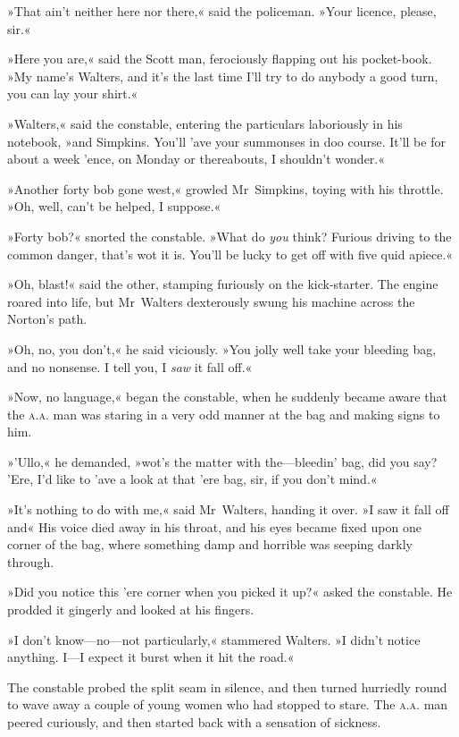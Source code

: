 »That ain't neither here nor there,« said the policeman. »Your licence, please, sir.«

»Here you are,« said the Scott man, ferociously flapping out his pocket-book. »My name's Walters, and it's the last time I'll try to do anybody a good turn, you can lay your shirt.«

»Walters,« said the constable, entering the particulars laboriously in his notebook, »and Simpkins. You'll 'ave your summonses in doo course. It'll be for about a week 'ence, on Monday or thereabouts, I shouldn't wonder.«

»Another forty bob gone west,« growled Mr~Simpkins, toying with his throttle. »Oh, well, can't be helped, I suppose.«

»Forty bob?« snorted the constable. »What do \textit{you} think? Furious driving to the common danger, that's wot it is. You'll be lucky to get off with five quid apiece.«

»Oh, blast!« said the other, stamping furiously on the kick-starter. The engine roared into life, but Mr~Walters dexterously swung his machine across the Norton's path.

»Oh, no, you don't,« he said viciously. »You jolly well take your bleeding bag, and no nonsense. I tell you, I \textit{saw} it fall off.«

»Now, no language,« began the constable, when he suddenly became aware that the \textsc{a.a.} man was staring in a very odd manner at the bag and making signs to him.

»'Ullo,« he demanded, »wot's the matter with the—bleedin' bag, did you say? 'Ere, I'd like to 'ave a look at that 'ere bag, sir, if you don't mind.«

»It's nothing to do with me,« said Mr~Walters, handing it over. »I saw it fall off and\longdash« His voice died away in his throat, and his eyes became fixed upon one corner of the bag, where something damp and horrible was seeping darkly through.

»Did you notice this 'ere corner when you picked it up?« asked the constable. He prodded it gingerly and looked at his fingers.

»I don't know—no—not particularly,« stammered Walters. »I didn't notice anything. I—I expect it burst when it hit the road.«

The constable probed the split seam in silence, and then turned hurriedly round to wave away a couple of young women who had stopped to stare. The \textsc{a.a.} man peered curiously, and then started back with a sensation of sickness.

